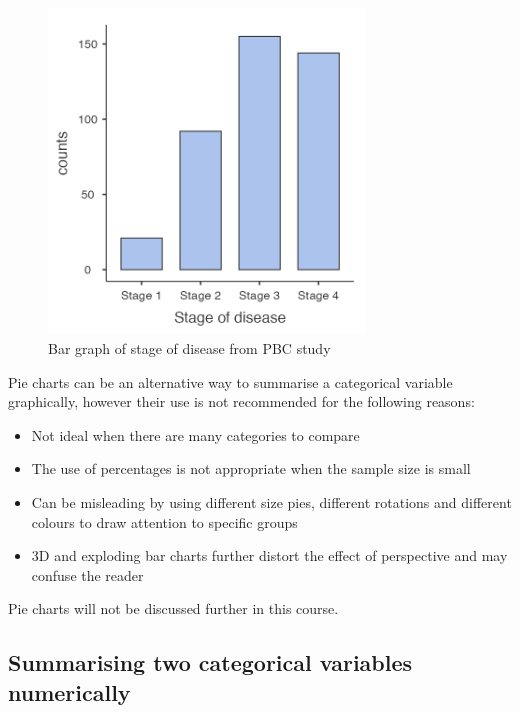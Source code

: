 \documentclass[
  a4paper,
]{memoir}
\providecommand{\tightlist}{%
  \setlength{\itemsep}{0pt}\setlength{\parskip}{0pt}}\usepackage{longtable,booktabs,array}
\begin{document}
\begin{figure}[H]

{\centering \includegraphics[width=0.75\textwidth,height=\textheight]{img/mod01/pbc-bar.png}

}

\caption{\label{fig-bar-1}Bar graph of stage of disease from PBC study}

\end{figure}

Pie charts can be an alternative way to summarise a categorical variable
graphically, however their use is not recommended for the following
reasons:

\begin{itemize}
\tightlist
\item
  Not ideal when there are many categories to compare
\item
  The use of percentages is not appropriate when the sample size is
  small
\item
  Can be misleading by using different size pies, different rotations
  and different colours to draw attention to specific groups
\item
  3D and exploding bar charts further distort the effect of perspective
  and may confuse the reader
\end{itemize}

Pie charts will not be discussed further in this course.

\hypertarget{summarising-two-categorical-variables-numerically}{%
\subsection{Summarising two categorical variables
numerically}\label{summarising-two-categorical-variables-numerically}}
\end{document}
